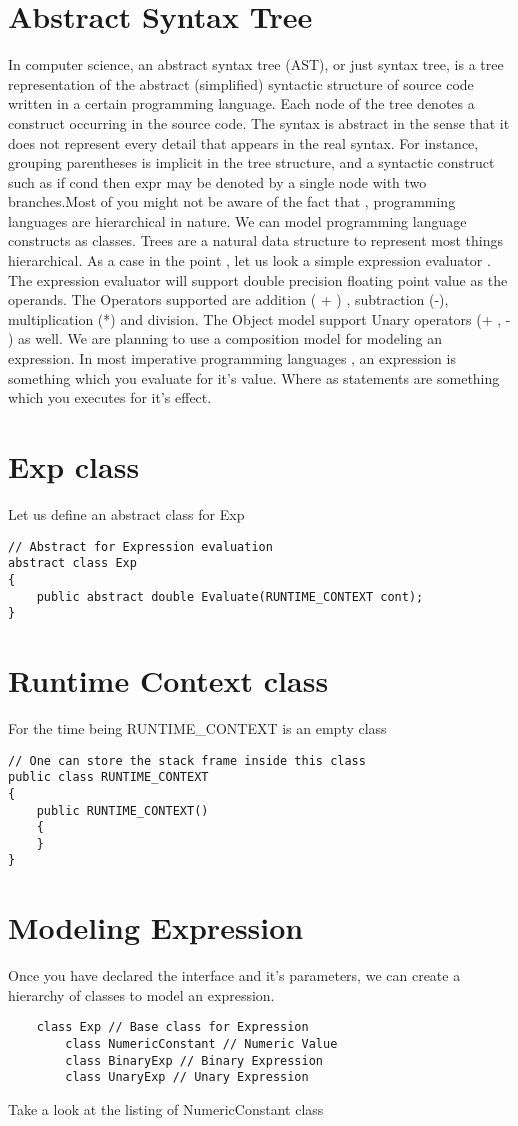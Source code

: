 \section{Abstract Syntax Tree}
In computer science, an abstract syntax tree (AST), or just syntax tree, is a tree representation of the abstract (simplified) syntactic structure of source code written in a certain programming language. Each node of the tree denotes a construct occurring in the source code. The syntax is abstract in the sense that it does not represent every detail that appears in the real syntax. For instance, grouping parentheses is implicit in the tree structure, and a syntactic construct such as if cond then expr may be denoted by a single node with two branches.Most of you might not be aware of the fact that , programming languages are hierarchical in nature. We can model programming language constructs as classes. Trees are a natural data structure to represent
most things hierarchical. As a case in the point , let us look a simple expression evaluator . The expression evaluator will support double
precision floating point value as the operands.  The Operators supported are addition ( + ) , subtraction (-), multiplication (*) and division. The Object model support Unary operators (+ , - ) as well. We are planning to use a composition model for modeling an expression. In most imperative programming languages , an expression is something which you evaluate for it's value. Where
as statements are something which you executes for it's effect.
\clearpage
\section{Exp class}
Let us define an abstract class for Exp
\lstset{style=csharp}
\begin{lstlisting}
// Abstract for Expression evaluation
abstract class Exp
{
	public abstract double Evaluate(RUNTIME_CONTEXT cont);
}
\end{lstlisting}
\section{Runtime Context class}
For the time being RUNTIME\_CONTEXT is an empty class
\lstset{style=csharp}
\begin{lstlisting}
// One can store the stack frame inside this class
public class RUNTIME_CONTEXT
{
	public RUNTIME_CONTEXT()
	{
	}
}
\end{lstlisting}
\section{Modeling Expression}
Once you have declared the interface and it's parameters, we can create a hierarchy of classes to model an expression.
\begin{verbatim}
	class Exp // Base class for Expression
		class NumericConstant // Numeric Value
		class BinaryExp // Binary Expression
		class UnaryExp // Unary Expression
\end{verbatim}
Take a look at the listing of NumericConstant class
\clearpage
